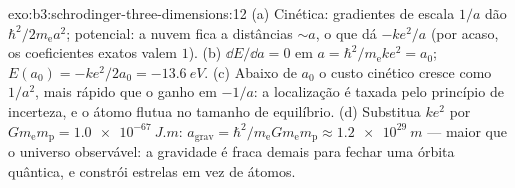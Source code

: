 \begin{solution}{exo:b3:schrodinger-three-dimensions:12}
(a) Cinética: gradientes de escala $1/a$ dão $\hbar^2/2m_{\text{e}}
a^2$; potencial: a nuvem fica a distâncias $\sim a$, o que dá
$-ke^2/a$ (por acaso, os coeficientes exatos valem $1$). (b) $\dd E/\dd
a = 0$ em $a = \hbar^2/m_{\text{e}}ke^2 = a_0$; $E(a_0) =
-ke^2/2a_0 = \qty{-13.6}{eV}$. (c) Abaixo de $a_0$ o custo cinético
cresce como $1/a^2$, mais rápido que o ganho em $-1/a$: a localização é
taxada pelo princípio de incerteza, e o átomo flutua no tamanho de
equilíbrio. (d) Substitua $ke^2$ por $Gm_{\text{e}}m_{\text{p}} =
\qty{1.0e-67}{J.m}$: $a_{\text{grav}} = \hbar^2/m_{\text{e}}G
m_{\text{e}}m_{\text{p}} \approx \qty{1.2e29}{m}$ --- maior que o
universo observável: a gravidade é fraca demais para fechar uma órbita
quântica, e constrói estrelas em vez de átomos.
\end{solution}

